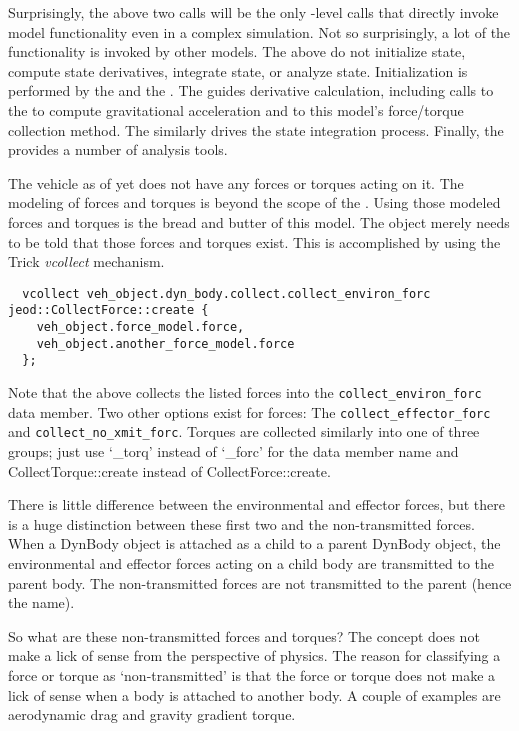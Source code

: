 Surprisingly, the above two calls will be the only \Sdefine-level calls that
directly invoke model functionality even in a complex simulation.
Not so surprisingly, a lot of the functionality is invoked by other models.
The above do not initialize state, compute state derivatives, integrate state,
or analyze state. Initialization is performed by the 
and the .
The \DYNMANAGER guides derivative calculation, including calls to the
 to compute gravitational acceleration and to
this model's force/torque collection method.
The \DYNMANAGER similarly drives the state integration process.
Finally, the  provides a number of analysis tools.

The vehicle as of yet does not have any forces or torques acting on it.
The modeling of forces and torques is beyond the scope of the \ModelDesc.
Using those modeled forces and torques is the bread and butter of this model.
The object merely needs to be told that those forces and torques exist.
This is accomplished by using the Trick \emph{vcollect} mechanism.
\begin{verbatim}
  vcollect veh_object.dyn_body.collect.collect_environ_forc jeod::CollectForce::create {
    veh_object.force_model.force,
    veh_object.another_force_model.force
  };
\end{verbatim}

Note that the above collects the listed forces into the
\verb+collect_environ_forc+ data member. Two other options exist for forces:
The \verb+collect_effector_forc+ and \verb+collect_no_xmit_forc+.
Torques are collected similarly into one of three groups; just use `\_torq'
instead of `\_forc' for the data member name and CollectTorque::create instead
of CollectForce::create.

There is little difference between the environmental and effector forces, but
there is a huge distinction between these first two and the non-transmitted forces.
When a DynBody object is attached as a child to a parent DynBody
object, the environmental and effector forces acting on a child body are
transmitted to the parent body. The non-transmitted forces are not transmitted
to the parent (hence the name).

So what are these non-transmitted forces and torques? The concept does not
make a lick of sense from the perspective of physics. The reason for classifying
a force or torque as `non-transmitted' is that the force or torque does not
make a lick of sense when a body is attached to another body.
A couple of examples are aerodynamic drag and gravity gradient torque.

